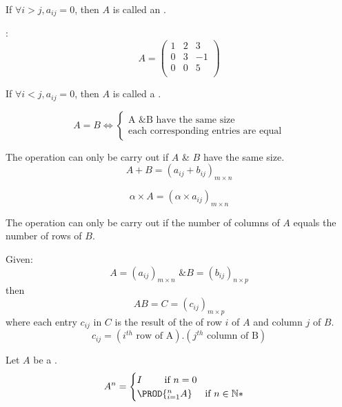     \par If $\forall i > j, a_{ij} = 0$, then $A$ is called an .
    \par {}:
    \[
      A =
      \begin{pmatrix}
        1 & 2 &  3 \\
        0 & 3 & -1 \\
        0 & 0 &  5 \\
      \end{pmatrix}
    \]
    \par If $\forall i < j, a_{ij} = 0$, then $A$ is called a .



    \[
      A = B \iff
      \begin{cases}
        \mbox{A \& B have the same size} \\
        \mbox{each corresponding entries are equal}
      \end{cases}
    \]

    \par The operation can only be carry out if $A$ \& $B$ have the same
    size.
    \[
      A + B = (a_{ij} + b_{ij})_{m \times n}
    \]

    \[
      \alpha \times A = (\alpha \times a_{ij})_{m \times n}
    \]

    \par The operation can only be carry out if the number of columns of 
    $A$ equals the number of rows of $B$.
    \par Given:
    \[
        A = (a_{ij})_{m \times n} \mbox{ \& }
        B = (b_{ij})_{n \times p}
    \]
    then
    \[
      AB = C = (c_{ij})_{m \times p}
    \]
    where each entry $c_{ij}$ in $C$ is the result of the  of
    row $i$ of $A$ and column $j$ of $B$.
    \[
      c_{ij} = (i^{th} \mbox{ row of A}) . (j^{th} \mbox{ column of B})
    \]

    \par Let $A$ be a .
    \[
      A^{n} =
      \begin{cases}
        I \qquad \mbox{ if } n = 0 \\
        \PROD{_{i = 1}^{n} A} \quad \mbox{ if } n \in \mathbb{N*}
      \end{cases}
    \]

